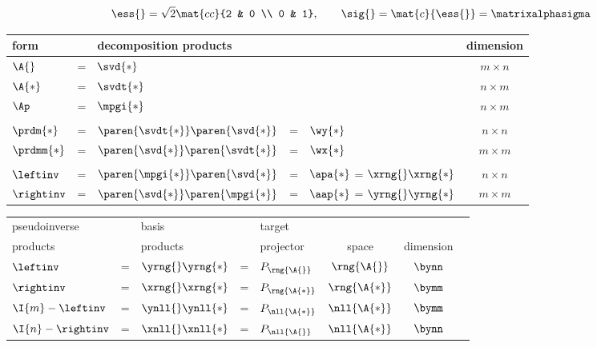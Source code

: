 \documentclass[10pt]{newsiambook}
\begin{document}
\begin{equation*}
  \ess{} = \sqrt{2} \mat{cc}{2 & 0 \\ 0 & 1}, \qquad \sig{}= \mat{c}{\ess{}} = \matrixalphasigma
\end{equation*}

\clearpage
\break

\begin{table}[htdp]
\begin{center}
\begin{tabular}{lclllc}
  form && decomposition products &&& dimension \\\hline
  $\A{}$  &=& $\svd{*}$  &&& $m \times n$ \\
  $\A{*}$ &=& $\svdt{*}$ &&& $n \times m$ \\
  $\Ap$   &=& $\mpgi{*}$ &&& $n \times m$ \\
        &&&&\\
  $\prdm{*}$ &=& $\paren{\svdt{*}}\paren{\svd{*}}$ &=& $\wy{*}$ & $n \times n$ \\
  $\prdmm{*}$&=& $\paren{\svd{*}}\paren{\svdt{*}}$ &=& $\wx{*}$ & $m \times m$ \\
        &&&&\\
  $\leftinv$ &=& $\paren{\mpgi{*}}\paren{\svd{*}}$ &=& $\apa{*}$ = $\xrng{}\xrng{*}$ & $n \times n$ \\
  $\rightinv$&=& $\paren{\svd{*}}\paren{\mpgi{*}}$ &=& $\aap{*}$ = $\yrng{}\yrng{*}$ & $m \times m$ \\[10pt]
\end{tabular}
\end{center}
\label{default}
\end{table}%
  

\begin{table}[htdp]
\begin{center}
\begin{tabular}{lclclccc}
  pseudoinverse && basis && target & \\
  products &&      products && projector & space & dimension \\\hline
  $\leftinv$  &=& $\yrng{}\yrng{*}$ &=& $P_{\rng{\A{}}}$ & $\rng{\A{}}$ & $\bynn$ \\
  $\rightinv$ &=& $\xrng{}\xrng{*}$ &=& $P_{\rng{\A{*}}}$ & $\rng{\A{*}}$ & $\bymm$ \\
  $\I{m}-\leftinv$  &=& $\ynll{}\ynll{*}$ &=& $P_{\nll{\A{*}}}$ & $\nll{\A{*}}$ & $\bymm$ \\
  $\I{n}-\rightinv$ &=& $\xnll{}\xnll{*}$ &=& $P_{\nll{\A{}}}$ & $\nll{\A{*}}$ & $\bynn$ \\[10pt]
\end{tabular}
\end{center}
\label{default}
\end{table}%
\end{document}
